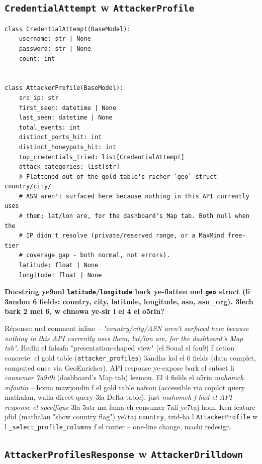 \documentclass[11pt,a4paper]{report}
\DeclareRobustCommand{\code}[1]{\texttt{#1}}
\begin{document}
\subsection{\code{CredentialAttempt} w \code{AttackerProfile}}

\begin{lstlisting}[style=pystyle]
class CredentialAttempt(BaseModel):
    username: str | None
    password: str | None
    count: int


class AttackerProfile(BaseModel):
    src_ip: str
    first_seen: datetime | None
    last_seen: datetime | None
    total_events: int
    distinct_ports_hit: int
    distinct_honeypots_hit: int
    top_credentials_tried: list[CredentialAttempt]
    attack_categories: list[str]
    # Flattened out of the gold table's richer `geo` struct - country/city/
    # ASN aren't surfaced here because nothing in this API currently uses
    # them; lat/lon are, for the dashboard's Map tab. Both null when the
    # IP didn't resolve (private/reserved range, or a MaxMind free-tier
    # coverage gap - both normal, not errors).
    latitude: float | None
    longitude: float | None
\end{lstlisting}

\begin{soual}
\textbf{Docstring ye9oul \code{latitude}/\code{longitude} bark ye-flatten
mel \code{geo} struct (li 3andou 6 fields: country, city, latitude,
longitude, asn, asn\_org). 3lech bark 2 mel 6, w chnowa ye-sir l el 4
el o5rin?}

Réponse: mel comment inline -- \emph{"country/city/ASN aren't surfaced
here because nothing in this API currently uses them; lat/lon are, for
the dashboard's Map tab"}. Hedhi el falsafa "presentation-shaped view"
(el Soual el fou9) f action concrete: el gold table (\code{attacker\_profiles})
3andha kol el 6 fields (data complet, computed once via GeoEnricher).
API response ye-expose bark el subset li \emph{consumer 7a9i9i} (dashboard's
Map tab) lezmou. El 4 fields el o5rin \emph{mahomch mfoutin} -- homa
mawjoudin f el gold table nafsou (accessible via copilot query mathalan,
walla direct query 3la Delta table), just \emph{mahomch f had el API
response el specifique} 3la 5atr ma-fama-ch consumer 7ali ye7taj-hom.
Ken feature jdid (mathalan "show country flag") ye7taj \code{country},
tzid-ha l \code{AttackerProfile} w l \code{\_select\_profile\_columns}
f el router -- one-line change, machi redesign.
\end{soual}

\subsection{\code{AttackerProfilesResponse} w \code{AttackerDrilldown}}
\end{document}
